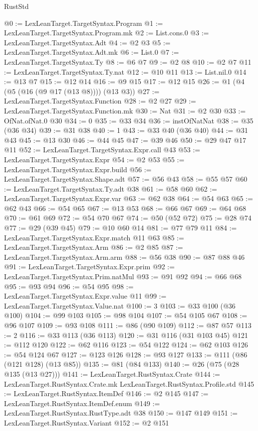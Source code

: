 \begin{lexlean}{RustStd}
\begin{coremodule}
{\begin{coremodule}
{{{{{{@0 := LexLeanTarget.TargetSyntax.Program
@1 := LexLeanTarget.TargetSyntax.Program.mk
@2 := List.cons.{0}
@3 := LexLeanTarget.TargetSyntax.Adt
@4 := @2 @3
@5 := LexLeanTarget.TargetSyntax.Adt.mk
@6 := List.{0}
@7 := LexLeanTarget.TargetSyntax.Ty
@8 := @6 @7
@9 := @2 @8
@10 := @2 @7
@11 := LexLeanTarget.TargetSyntax.Ty.nat
@12 := @10 @11
@13 := List.nil.{0}
@14 := @13 @7
@15 := @12 @14
@16 := @9 @15
@17 := @12 @15
@26 := @1 (@4 (@5 (@16 (@9 @17 (@13 @8)))) (@13 @3))
@27 := LexLeanTarget.TargetSyntax.Function
@28 := @2 @27
@29 := LexLeanTarget.TargetSyntax.Function.mk
@30 := Nat
@31 := @2 @30
@33 := OfNat.ofNat.{0} @30
@34 := 0
@35 := @33 @34
@36 := instOfNatNat
@38 := @35 (@36 @34)
@39 := @31 @38
@40 := 1
@43 := @33 @40 (@36 @40)
@44 := @31 @43
@45 := @13 @30
@46 := @44 @45
@47 := @39 @46
@50 := @29 @47 @17 @11
@52 := LexLeanTarget.TargetSyntax.Expr.call @43
@53 := LexLeanTarget.TargetSyntax.Expr
@54 := @2 @53
@55 := LexLeanTarget.TargetSyntax.Expr.build
@56 := LexLeanTarget.TargetSyntax.Shape.adt
@57 := @56 @43
@58 := @55 @57
@60 := LexLeanTarget.TargetSyntax.Ty.adt @38
@61 := @58 @60
@62 := LexLeanTarget.TargetSyntax.Expr.var
@63 := @62 @38
@64 := @54 @63
@65 := @62 @43
@66 := @54 @65
@67 := @13 @53
@68 := @66 @67
@69 := @64 @68
@70 := @61 @69
@72 := @54 @70 @67
@74 := @50 (@52 @72)
@75 := @28 @74
@77 := @29 (@39 @45)
@79 := @10 @60 @14
@81 := @77 @79 @11
@84 := LexLeanTarget.TargetSyntax.Expr.match @11 @63
@85 := LexLeanTarget.TargetSyntax.Arm
@86 := @2 @85
@87 := LexLeanTarget.TargetSyntax.Arm.arm
@88 := @56 @38
@90 := @87 @88 @46
@91 := LexLeanTarget.TargetSyntax.Expr.prim
@92 := LexLeanTarget.TargetSyntax.Prim.natMul
@93 := @91 @92
@94 := @66 @68
@95 := @93 @94
@96 := @54 @95
@98 := LexLeanTarget.TargetSyntax.Expr.value @11
@99 := LexLeanTarget.TargetSyntax.Value.nat
@100 := 3
@103 := @33 @100 (@36 @100)
@104 := @99 @103
@105 := @98 @104
@107 := @54 @105 @67
@108 := @96 @107
@109 := @93 @108
@111 := @86 (@90 @109)
@112 := @87 @57
@113 := 2
@116 := @33 @113 (@36 @113)
@120 := @31 @116 (@31 @103 @45)
@121 := @112 @120
@122 := @62 @116
@123 := @54 @122
@124 := @62 @103
@126 := @54 @124 @67
@127 := @123 @126
@128 := @93 @127
@133 := @111 (@86 (@121 @128) (@13 @85))
@135 := @81 (@84 @133)
@140 := @26 (@75 (@28 @135 (@13 @27)))
@141 := LexLeanTarget.RustSyntax.Crate
@144 := LexLeanTarget.RustSyntax.Crate.mk LexLeanTarget.RustSyntax.Profile.std
@145 := LexLeanTarget.RustSyntax.ItemDef
@146 := @2 @145
@147 := LexLeanTarget.RustSyntax.ItemDef.enum
@149 := LexLeanTarget.RustSyntax.RustType.adt @38
@150 := @147 @149
@151 := LexLeanTarget.RustSyntax.Variant
@152 := @2 @151
}}}}}}
\end{coremodule}}
\end{coremodule}
\end{lexlean}
